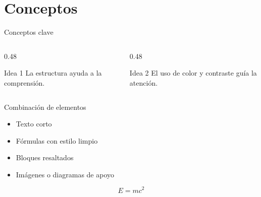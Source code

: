 \section{Conceptos}

\begin{frame}{Conceptos clave}
  \begin{columns}
    \begin{column}{0.48\textwidth}
      \begin{block}{Idea 1}
        La estructura ayuda a la comprensión.
      \end{block}
    \end{column}
    \begin{column}{0.48\textwidth}
      \begin{block}{Idea 2}
        El uso de color y contraste guía la atención.
      \end{block}
    \end{column}
  \end{columns}
\end{frame}

\begin{frame}{Combinación de elementos}
  \begin{itemize}
    \item Texto corto
    \item Fórmulas con estilo limpio
    \item Bloques resaltados
    \item Imágenes o diagramas de apoyo
  \end{itemize}

  \vspace{0.3cm}
  \begin{equation}
    E = mc^2
  \end{equation}
\end{frame}
